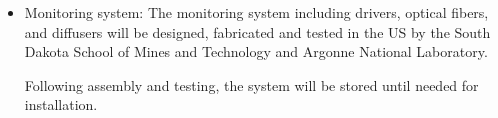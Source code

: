 \begin{itemize}
\item Monitoring system: The monitoring system including  drivers, optical fibers, and diffusers will be designed, fabricated and tested in the US by the South Dakota School of Mines and Technology and Argonne National Laboratory. 

Following assembly and testing, the system will be stored until needed for installation.



\end{itemize}

